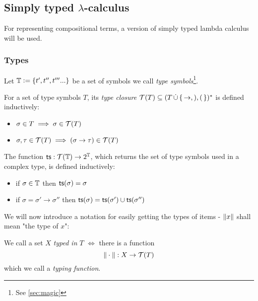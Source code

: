 \documentclass[main.tex]{subfiles}
\begin{document}
\subsection{Simply typed $\lambda$-calculus}
\label{sec:purelambda}

For representing compositional terms, a version of simply typed lambda calculus
will be used.

\subsubsection{Types}
\label{purelambda:types}
Let $\mathbb{T} \vcentcolon= \{ t', t'', t''' ... \}$ be a set of symbols we call
    \emph{type symbols}\footnote{See \cref{sec:magic}}.

\begin{defn}
    For a set of type symbols $T$, its \emph{type closure}
    $\mathcal{T}( T ) \subseteq (T \, \dot\cup \,\{\, \rightarrow, ), ( \,\})^*$ is defined
    inductively:

    \begin{itemize}
        \item $\sigma \in T \implies \sigma \in \mathcal{T}( T )$
        \item $\sigma, \tau \in \mathcal{T}( T ) \implies (\sigma \rightarrow \tau) \in \mathcal{T}( T )$
    \end{itemize}
\end{defn}

\begin{defn}
    The function $\mathsf{ts} : \mathcal{T}( \mathbb{T} ) \rightarrow 2^{\mathbb{T}}$, which
    returns the set of type symbols used in a complex type, is defined inductively:

    \begin{itemize}
        \item if $\sigma \in \mathbb{T}$ then $\mathsf{ts}(\sigma) = \sigma$
        \item if $\sigma = \sigma' \rightarrow \sigma''$ then
            $\mathsf{ts}(\sigma) = \mathsf{ts}(\sigma') \cup \mathsf{ts}(\sigma'')$
    \end{itemize}
\end{defn}

We will now introduce a notation for easily getting the types of items -
$\|x\|$ shall mean "the type of $x$":

\begin{defn}
    We call a set $X$ \emph{typed in} $T$ $\iff$ there is a function
    \[ \|\cdot\| : X \rightarrow \mathcal{T}( T ) \]
    which we call a \emph{typing function}.
\end{defn}
\end{document}

